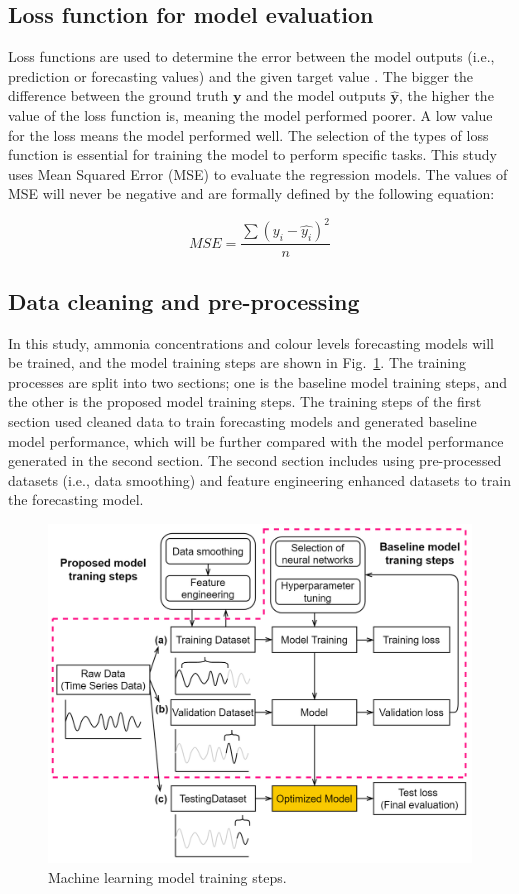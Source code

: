 \subsection{Loss function for model evaluation}
Loss functions are used to determine the error between the model outputs (i.e., prediction or forecasting values) and the given target value \citep{deepaiLossFunction2022}. The bigger the difference between the ground truth $\bm{y}$ and the model outputs $\bm{\hat{y}}$, the higher the value of the loss function is, meaning the model performed poorer. A low value for the loss means the model performed well. The selection of the types of loss function is essential for training the model to perform specific tasks. This study uses Mean Squared Error (MSE) to evaluate the regression models. The values of MSE will never be negative and are formally defined by the following equation:

\begin{equation}\label{eq-mse}
    MSE=\frac{\sum (y_i-\hat{y_i})^2}{n}
\end{equation}

\subsection{Data cleaning and pre-processing}
In this study, ammonia concentrations and colour levels forecasting models will be trained, and the model training steps are shown in Fig.~\ref{fig:training-scheme}. The training processes are split into two sections; one is the baseline model training steps, and the other is the proposed model training steps. The training steps of the first section used cleaned data to train forecasting models and generated baseline model performance, which will be further compared with the model performance generated in the second section. The second section includes using pre-processed datasets (i.e., data smoothing) and feature engineering enhanced datasets to train the forecasting model. 

\begin{figure}[h]
    \centering
    \includegraphics[width=0.9\columnwidth]{imgs/pre-processing/training-scheme.png}
    \caption{Machine learning model training steps.}
    \label{fig:training-scheme}
\end{figure}

